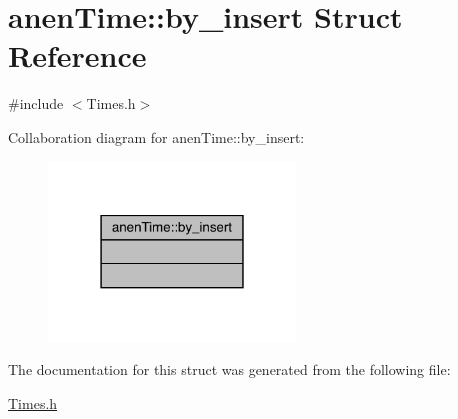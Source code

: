 \hypertarget{structanen_time_1_1by__insert}{}\section{anen\+Time\+:\+:by\+\_\+insert Struct Reference}
\label{structanen_time_1_1by__insert}


{\ttfamily \#include $<$Times.\+h$>$}



Collaboration diagram for anen\+Time\+:\+:by\+\_\+insert\+:\nopagebreak
\begin{figure}[H]
\begin{center}
\leavevmode
\includegraphics[width=186pt]{structanen_time_1_1by__insert__coll__graph}
\end{center}
\end{figure}


The documentation for this struct was generated from the following file\+:\begin{DoxyCompactItemize}
\item 
\mbox{\hyperlink{_times_8h}{Times.\+h}}\end{DoxyCompactItemize}
